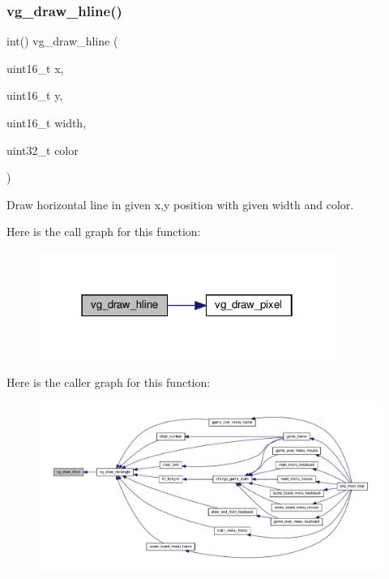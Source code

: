 \subsubsection{\texorpdfstring{vg\+\_\+draw\+\_\+hline()}{vg\_draw\_hline()}}
{\footnotesize\ttfamily int() vg\+\_\+draw\+\_\+hline (\begin{DoxyParamCaption}\item[{uint16\+\_\+t}]{x,  }\item[{uint16\+\_\+t}]{y,  }\item[{uint16\+\_\+t}]{width,  }\item[{uint32\+\_\+t}]{color }\end{DoxyParamCaption})}



Draw horizontal line in given x,y position with given width and color. 

Here is the call graph for this function\+:
\nopagebreak
\begin{figure}[H]
\begin{center}
\leavevmode
\includegraphics[width=274pt]{group__graphics_ga1677f4b59f9e0584d82e0b655e4b7fc9_cgraph}
\end{center}
\end{figure}
Here is the caller graph for this function\+:
\nopagebreak
\begin{figure}[H]
\begin{center}
\leavevmode
\includegraphics[width=350pt]{group__graphics_ga1677f4b59f9e0584d82e0b655e4b7fc9_icgraph}
\end{center}
\end{figure}
\mbox{\label{group__graphics_ga08c498ffeb0a3962e3b7711b57397741}} 
